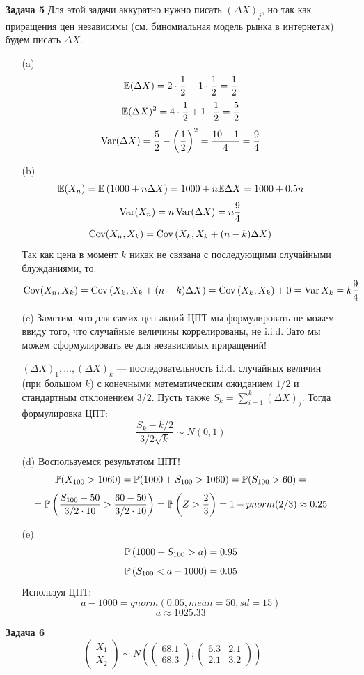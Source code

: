 \documentclass[12pt, a4paper]{article}\usepackage[]{graphicx}\usepackage[]{color}
\begin{document}
\begin{enumerate}
\item[\textbf{Задача 5}]
Для этой задачи аккуратно нужно писать \( \left(\Delta X \right)_j \), но так как приращения цен независимы (см. биномиальная модель рынка в интернетах) будем писать \( \Delta X \).
\begin{itemize}
\item[(a)] \[\E (\Delta X) = 2 \cdot \dfrac{1}{2} - 1 \cdot \dfrac{1}{2} = \dfrac{1}{2} \]
\[\E (\Delta X)^2 = 4 \cdot \dfrac{1}{2} + 1 \cdot \dfrac{1}{2} = \dfrac{5}{2} \]
\[\Var (\Delta X) = \dfrac{5}{2} - \left(\dfrac{1}{2}\right)^2 = \dfrac{10-1}{4}=\dfrac{9}{4} \]
\item[(b)] \[\E (X_n) = \E \left(1000 + n\Delta X \right)  = 1000 + n \E \Delta X = 1000 + 0.5 n     \]
\[ \Var (X_n) = n \Var (\Delta X) = n \dfrac{9}{4}  \]
\[ \Cov (X_n, X_k) = \Cov \left(X_k, X_k + (n-k) \Delta X \right)     \]
Так как цена в момент $k$ никак не связана с последующими случайными блужданиями, то:
\[ \Cov (X_n, X_k) = \Cov \left(X_k, X_k + (n-k) \Delta X \right) =  \Cov \left(X_k, X_k \right) + 0 = \Var X_k = k \dfrac{9}{4}    \]
\item[(c)] Заметим, что для самих цен акций ЦПТ мы формулировать не можем ввиду того, что случайные величины коррелированы, не i.i.d. Зато мы можем сформулировать ее для независимых приращений!

\( \left(\Delta X \right)_1, \ldots, \left(\Delta X \right)_{k} \) — последовательность i.i.d. случайных величин (при большом $k$) с конечными математическим ожиданием \(1/2 \) и стандартным отклонением \(3/2 \). Пусть также \( S_k = \sum_{i=1}^k \left(\Delta X \right)_j \). Тогда формулировка ЦПТ:
\[ \dfrac{S_k - k/2}{3/2 \sqrt{k}} \sim N(0,1)    \]
\item[(d)] Воспользуемся результатом ЦПТ!
\[\P(X_{100} > 1060) = \P (1000 + S_{100} > 1060) = \P(S_{100} >60) = \]
\[ = \P \left(\dfrac{S_{100} -50 }{3/2\cdot 10} > \dfrac{60-50}{3/2 \cdot 10}\right) = \P \left(Z > \dfrac{2}{3}\right) = 1-pnorm(2/3) \approx 0.25   \]

\item[(e)] \[ \P \left(1000 + S_{100} > a \right) = 0.95              \]
\[ \P \left( S_{100} < a-1000 \right) = 0.05              \]
Используя ЦПТ:
\[ a-1000 = qnorm(0.05, mean = 50, sd = 15 )            \]
\[ a \approx 1025.33   \]
\end{itemize}

\item[\textbf{Задача 6}]
$$\begin{pmatrix}
X_1 \\
X_2
\end{pmatrix} \sim N \left( \begin{pmatrix}
68.1 \\
68.3
\end{pmatrix} ; \begin{pmatrix}
6.3 & 2.1 \\
2.1 & 3.2
\end{pmatrix}                   \right)$$


\end{enumerate}
\end{document}

